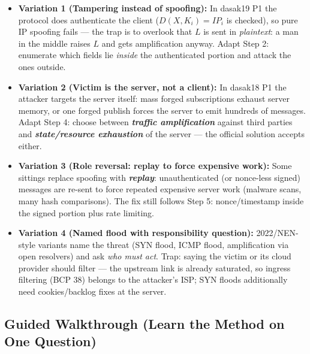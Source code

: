\documentclass[12pt, a4paper]{article}
\newcommand{\term}[1]{\textbf{\textit{#1}}}        %
\begin{document}
\begin{trapbox}
\begin{itemize}
    \item \textbf{Variation 1 (Tampering instead of spoofing):} In dasak19 P1 the protocol does authenticate the client ($D(X, K_i) = IP_i$ is checked), so pure IP spoofing fails --- the trap is to overlook that $L$ is sent in \emph{plaintext}: a man in the middle raises $L$ and gets amplification anyway. Adapt Step 2: enumerate which fields lie \emph{inside} the authenticated portion and attack the ones outside.
    \item \textbf{Variation 2 (Victim is the server, not a client):} In dasak18 P1 the attacker targets the server itself: mass forged subscriptions exhaust server memory, or one forged publish forces the server to emit hundreds of messages.
    Adapt Step 4: choose between \term{traffic amplification} against third parties and \term{state/resource exhaustion} of the server --- the official solution accepts either.
    \item \textbf{Variation 3 (Role reversal: replay to force expensive work):} Some sittings replace spoofing with \term{replay}: unauthenticated (or nonce-less signed) messages are re-sent to force repeated expensive server work (malware scans, many hash comparisons). The fix still follows Step 5: nonce/timestamp inside the signed portion plus rate limiting.
    \item \textbf{Variation 4 (Named flood with responsibility question):} 2022/NEN-style variants name the threat (SYN flood, ICMP flood, amplification via open resolvers) and ask \emph{who must act}.
    Trap: saying the victim or its cloud provider should filter --- the upstream link is already saturated, so ingress filtering (BCP 38) belongs to the attacker's ISP; SYN floods additionally need cookies/backlog fixes at the server.
\end{itemize}
\end{trapbox}

\subsection*{Guided Walkthrough (Learn the Method on One Question)}
\end{document}
